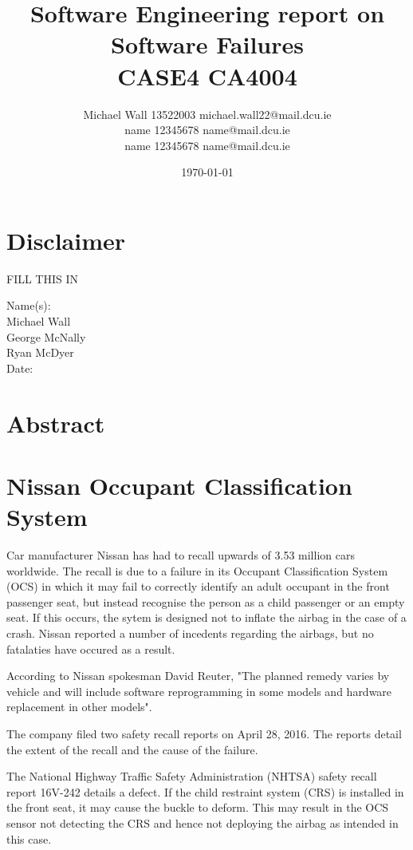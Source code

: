 \documentclass[a4paper,12pt]{article}
\title{Software Engineering report on Software Failures\\CASE4 CA4004}
\author{Michael Wall 13522003 michael.wall22@mail.dcu.ie\\name 12345678 name@mail.dcu.ie\\name 12345678 name@mail.dcu.ie}
\date{\today}
\begin{document}
\maketitle
\newpage

\tableofcontents

\newpage

\section{Disclaimer}
FILL THIS IN

Name(s): \\Michael Wall\\George McNally\\Ryan McDyer\\

Date:

\newpage

\section{Abstract}

\section{Nissan Occupant Classification System}
Car manufacturer Nissan has had to recall upwards of 3.53 million cars worldwide. The recall is due to a failure in its Occupant Classification System (OCS) in which it may fail to correctly identify an adult occupant in the front passenger seat, but instead recognise the person as a child passenger or an empty seat. If this occurs, the sytem is designed not to inflate the airbag in the case of a crash. Nissan reported a number of incedents regarding the airbags, but no fatalaties have occured as a result. 

According to Nissan spokesman David Reuter, "The planned remedy varies by vehicle and will include software reprogramming in some models and hardware replacement in other models".

The company filed two safety recall reports on April 28, 2016. The reports detail the extent of the recall and the cause of the failure.

The National Highway Traffic Safety Administration (NHTSA) safety recall report 16V-242 details a defect. If the child restraint system (CRS) is installed in the front seat, it may cause the buckle to deform. This may result in the OCS sensor not detecting the CRS and hence not deploying the airbag as intended in this case.
\end{document}
